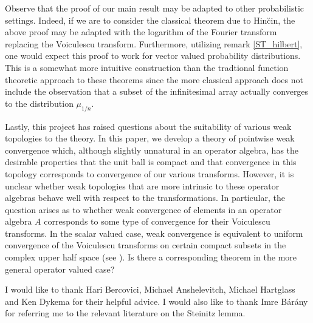 \documentclass[11pt]{amsart}
\newenvironment{acknowledgements}[1][Acknowledgements:]{\begin{trivlist}
\item[\hskip \labelsep {\bfseries #1}]}{\end{trivlist}}
\begin{document}
Observe that the proof of our main result may be adapted to other probabilistic settings.  Indeed, if we
are to consider the classical theorem due to Hin\u{c}in, the above proof may be adapted with the logarithm
of the Fourier transform replacing the Voiculescu transform.  Furthermore, utilizing remark \ref{ST_hilbert},
one would expect this proof to work for vector valued probability distributions.  This is a somewhat more intuitive
construction than the tradtional function theoretic approach to these theorems since the more classical approach does
not include the observation that a subset of the infinitesimal array actually converges to the distribution $\mu_{1/n}$.

Lastly, this project has raised questions about the suitability of various weak topologies to the theory.  In this paper, we develop
a theory of pointwise weak convergence which, although slightly unnatural in an operator algebra,
has the desirable properties that the unit ball is compact and that convergence in this topology corresponds to convergence of our various transforms.
  However, it is unclear whether weak topologies that are more intrinsic to these operator algebras behave well
with respect to the transformations. In particular, the question arises as to whether weak convergence of elements in an operator algebra $A$ corresponds
to some type of convergence for their Voiculescu transforms. In the scalar valued case, weak convergence is equivalent to uniform convergence of the Voiculescu
transforms on certain compact subsets in the complex upper half space (see \cite{BV1}).  Is there a corresponding theorem in the more general operator valued case?



\begin{acknowledgements}
I would like to thank Hari Bercovici, Michael Anshelevitch, Michael Hartglass and Ken Dykema for their helpful advice.  I would also like
to thank Imre B\'{a}r\'{a}ny for referring me to the relevant literature on the Steinitz lemma.
\end{acknowledgements}



\end{document}
